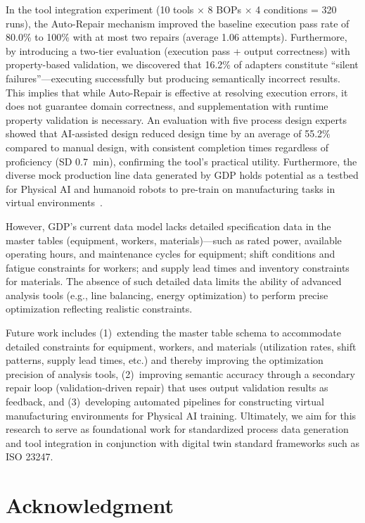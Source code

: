 \documentclass[conference]{IEEEtran}
\begin{document}
In the tool integration experiment (10 tools $\times$ 8 BOPs $\times$ 4 conditions = 320 runs), the Auto-Repair mechanism improved the baseline execution pass rate of 80.0\% to 100\% with at most two repairs (average 1.06 attempts). Furthermore, by introducing a two-tier evaluation (execution pass + output correctness) with property-based validation, we discovered that 16.2\% of adapters constitute ``silent failures''---executing successfully but producing semantically incorrect results. This implies that while Auto-Repair is effective at resolving execution errors, it does not guarantee domain correctness, and supplementation with runtime property validation is necessary. An evaluation with five process design experts showed that AI-assisted design reduced design time by an average of 55.2\% compared to manual design, with consistent completion times regardless of proficiency (SD 0.7~min), confirming the tool's practical utility. Furthermore, the diverse mock production line data generated by GDP holds potential as a testbed for Physical AI and humanoid robots to pre-train on manufacturing tasks in virtual environments~\cite{b15}.

However, GDP's current data model lacks detailed specification data in the master tables (equipment, workers, materials)---such as rated power, available operating hours, and maintenance cycles for equipment; shift conditions and fatigue constraints for workers; and supply lead times and inventory constraints for materials. The absence of such detailed data limits the ability of advanced analysis tools (e.g., line balancing, energy optimization) to perform precise optimization reflecting realistic constraints.

Future work includes (1)~extending the master table schema to accommodate detailed constraints for equipment, workers, and materials (utilization rates, shift patterns, supply lead times, etc.) and thereby improving the optimization precision of analysis tools, (2)~improving semantic accuracy through a secondary repair loop (validation-driven repair) that uses output validation results as feedback, and (3)~developing automated pipelines for constructing virtual manufacturing environments for Physical AI training. Ultimately, we aim for this research to serve as foundational work for standardized process data generation and tool integration in conjunction with digital twin standard frameworks such as ISO 23247.

\section*{Acknowledgment}
\end{document}
